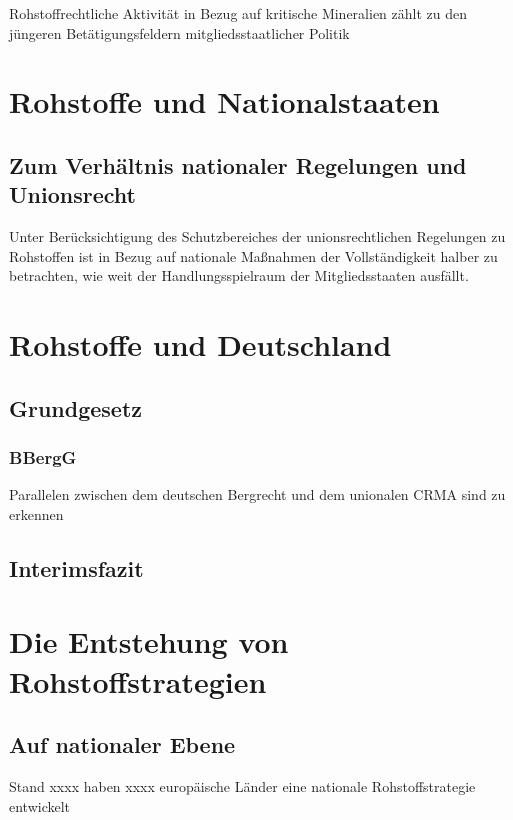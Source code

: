 \documentclass[12pt,a4paper,oneside]{book} %
\begin{document}
	 Rohstoffrechtliche Aktivität in Bezug auf kritische Mineralien zählt zu den jüngeren Betätigungsfeldern mitgliedsstaatlicher Politik
	
	 
	
	\section{Rohstoffe und Nationalstaaten}
	
	\subsection{Zum Verhältnis nationaler Regelungen und Unionsrecht}
	Unter Berücksichtigung des Schutzbereiches der unionsrechtlichen Regelungen zu Rohstoffen ist in Bezug auf nationale Maßnahmen der Vollständigkeit halber zu betrachten, wie weit der Handlungsspielraum der Mitgliedsstaaten ausfällt.
	

	
	\section{Rohstoffe und Deutschland}
	
	\subsection{Grundgesetz}
	
	\subsubsection{BBergG}
	Parallelen zwischen dem deutschen Bergrecht und dem unionalen CRMA sind zu erkennen
	
	\subsection{Interimsfazit}
	
	\section{Die Entstehung von Rohstoffstrategien}
	
	\subsection{Auf nationaler Ebene}
	Stand xxxx haben xxxx europäische Länder eine nationale Rohstoffstrategie entwickelt
	
\end{document}
